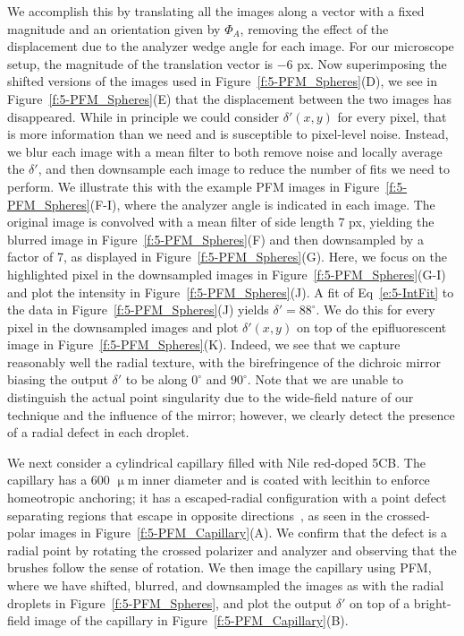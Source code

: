 We accomplish this by translating all the images along a vector with a fixed magnitude and an orientation given by $\Phi_A$, removing the effect of the displacement due to the analyzer wedge angle for each image.
For our microscope setup, the magnitude of the translation vector is $-6$ px.
Now superimposing the shifted versions of the images used in Figure~\ref{f:5-PFM_Spheres}(D), we see in Figure~\ref{f:5-PFM_Spheres}(E) that the displacement between the two images has disappeared.
While in principle we could consider $\delta'(x,y)$ for every pixel, that is more information than we need and is susceptible to pixel-level noise.
Instead, we blur each image with a mean filter to both remove noise and locally average the $\delta'$, and then downsample each image to reduce the number of fits we need to perform.
We illustrate this with the example PFM images in Figure~\ref{f:5-PFM_Spheres}(F-I), where the analyzer angle is indicated in each image.
The original image is convolved with a mean filter of side length 7 px, yielding the blurred image in Figure~\ref{f:5-PFM_Spheres}(F) and then downsampled by a factor of 7, as displayed in Figure~\ref{f:5-PFM_Spheres}(G).
Here, we focus on the highlighted pixel in the downsampled images in Figure~\ref{f:5-PFM_Spheres}(G-I) and plot the intensity in Figure~\ref{f:5-PFM_Spheres}(J).
A fit of Eq~\ref{e:5-IntFit} to the data in Figure~\ref{f:5-PFM_Spheres}(J) yields $\delta' = 88^{\circ}$.
We do this for every pixel in the downsampled images and plot $\delta'(x,y)$ on top of the epifluorescent image in Figure~\ref{f:5-PFM_Spheres}(K).
Indeed, we see that we capture reasonably well the radial texture, with the birefringence of the dichroic mirror biasing the output $\delta'$ to be along $0^{\circ}$ and $90^{\circ}$.
Note that we are unable to distinguish the actual point singularity due to the wide-field nature of our technique and the influence of the mirror; however, we clearly detect the presence of a radial defect in each droplet.

We next consider a cylindrical capillary filled with Nile red-doped 5CB.\@
The capillary has a 600 $\upmu$m inner diameter and is coated with lecithin to enforce homeotropic anchoring; it has a escaped-radial configuration with a point defect separating regions that escape in opposite directions~\cite{RN179}, as seen in the crossed-polar images in Figure~\ref{f:5-PFM_Capillary}(A).
We confirm that the defect is a radial point by rotating the crossed polarizer and analyzer and observing that the brushes follow the sense of rotation.
We then image the capillary using PFM, where we have shifted, blurred, and downsampled the images as with the radial droplets in Figure~\ref{f:5-PFM_Spheres}, and plot the output $\delta'$ on top of a bright-field image of the capillary in Figure~\ref{f:5-PFM_Capillary}(B).

